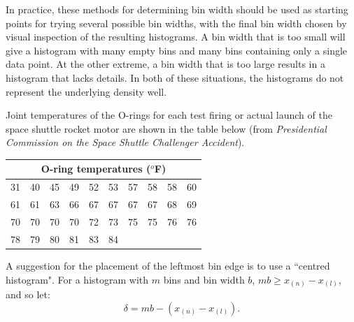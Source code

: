 In practice, these methods for determining bin width should be used as starting points for trying several possible bin widths, with the final bin width chosen by visual inspection of the resulting histograms. A bin width that is too small will give a histogram with many empty bins and many bins containing only a single data point. At the other extreme, a bin width that is too large results in a histogram that lacks details. In both of these situations, the histograms do not represent the underlying density well.

\begin{example}
Joint temperatures of the O-rings for each test firing or actual launch of the space shuttle rocket motor are shown in the table below (from {\it Presidential Commission on the Space Shuttle Challenger Accident}).
\begin{center}
\begin{tabular}{|cccccccccc|}\hline
\multicolumn{10}{|c|}{ O-ring temperatures ($^o$F)}\\\hline
31   &  40&     45   &  49&     52   &  53&     57  &   58&     58  &   60\\
61   &  61 &    63  &   66 &    67  &   67 &    67 &    67 &    68 &    69\\
70    & 70  &   70 &    70  &   72 &    73  &   75&     75  &   76&     76\\
78     &79   &  80&     81   &  83&     84&&&&\\\hline
\end{tabular}
\end{center}
\end{example}

A suggestion for the placement of the leftmost bin edge is to use a \textquotedblleft centred histogram". For a histogram with $m$ bins and bin width $b$, $mb\geq x_{(n)}-x_{(l)}$, and so let:
\begin{equation}
\delta=mb-(x_{(n)}-x_{(l)}).
\end{equation}


